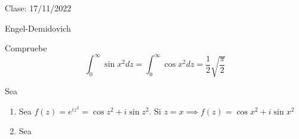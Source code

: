 Clase: 17/11/2022

Engel-Demidovich

\begin{ejemplo}
    Compruebe 
    $$\int_0^\infty \sin x^2dz =\int_0^\infty \cos x^2dz=\frac{1}{2}\sqrt{\frac{\pi}{2}}$$
    \begin{sol}
        Sea 
        \begin{enumerate}
            \item Sea $f(z)=e^{iz^2}=\cos z^2+i\sin z^2$. Si $z=x\implies f(z)=\cos x^2+i\sin x^2$
            \item Sea 
            \begin{cajita}
                
            \end{cajita}
        \end{enumerate}
        
    \end{sol}
\end{ejemplo}